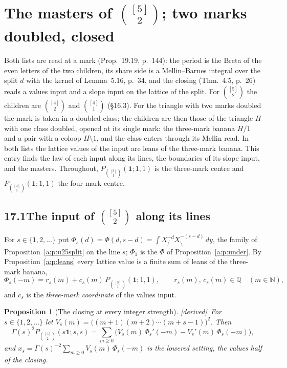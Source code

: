 \documentclass[11pt]{article}
\newcommand{\one}{\mathbf 1}
\newcommand{\Pth}{P_{\binom{[3]}1}(\one;1,1)}
\newcommand{\Pfour}{P_{\binom{[4]}1}(\one;1,1)}
\theoremstyle{plain}
\newtheorem{proposition}{Proposition}[section]
\theoremstyle{definition}
\theoremstyle{remark}
\renewcommand{\thesection}{15}
\renewcommand{\theproposition}{15.\arabic{proposition}}
\newcommand{\derived}{\textup{[derived]}}
\begin{document}
\renewcommand{\thesection}{17}
\setcounter{proposition}{0}
\renewcommand{\theproposition}{17.\arabic{proposition}}

\section{The masters of $\binom{[5]}2$; two marks doubled, closed}

Both lists are read at a mark (Prop.~19.19, p.~144): the period is the Breta of the even letters of the two children, its share side is a Mellin--Barnes integral over the split $d$ with the kernel of Lemma~5.16, p.~34, and the closing (Thm.~4.5, p.~26) reads a values input and a slope input on the lattice of the split. For $\binom{[5]}2$ the children are $\binom{[4]}2$ and $\binom{[4]}1$ (\S16.3). For the triangle with two marks doubled the mark is taken in a doubled class; the children are then those of the triangle $H$ with one class doubled, opened at its single mark: the three-mark banana $H/1$ and a pair with a coloop $H\setminus1$, and the class enters through its Mellin read. In both lists the lattice values of the input are leans of the three-mark banana. This entry finds the law of each input along its lines, the boundaries of its slope input, and the masters. Throughout, $\Pth$ is the three-mark centre and $\Pfour$ the four-mark centre.

\subsection*{17.1\quad The input of $\binom{[5]}2$ along its lines}

For $s\in\{1,2,\dots\}$ put $\Phi_s(d)=\Phi(d,s-d)=\int X_{/}^{-d}X_{\setminus}^{-(s-d)}\,dy$, the family of Proposition~\ref{a:p:u25split} on the line $s$; $\Phi_1$ is the $\Phi$ of Proposition~\ref{a:p:under}. By Proposition~\ref{a:p:leans} every lattice value is a finite sum of leans of the three-mark banana,
\[
\Phi_s(-m)=r_s(m)+c_s(m)\,\Pth,\qquad r_s(m),\,c_s(m)\in\mathbb Q\quad(m\in\mathbb N),
\]
and $c_s$ is the \emph{three-mark coordinate} of the values input.

\begin{proposition}[The closing at every integer strength]\label{a:p:u25clos}\derived\
For $s\in\{1,2,\dots\}$ let $V_s(m)=\big((m+1)(m+2)\cdots(m+s-1)\big)^2$. Then
\[
\Gamma(s)^2P_{\binom{[5]}2}(s\one;s,s)=\sum_{m\ge0}\Big(V_s(m)\,\Phi_s'(-m)-V_s'(m)\,\Phi_s(-m)\Big),
\]
and $x_s=\Gamma(s)^{-2}\sum_{m\ge0}V_s(m)\,\Phi_s(-m)$ is the lowered setting, the values half of the closing.
\end{proposition}
\end{document}
